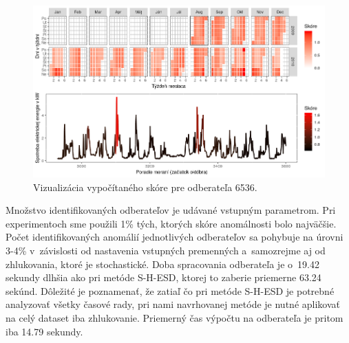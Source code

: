 \documentclass[a4paper,twoside,slovak,12pt,appendix]{article}
\begin{document}
\begin{figure}[H]
  \centering
  \includegraphics[width=\textwidth]{results_my_6536.png}
  \caption{Vizualizácia vypočítaného skóre pre odberateľa 6536.}
	\label{fig:results-my-6536}
\end{figure}

\noindent
Množstvo identifikovaných odberateľov je udávané vstupným parametrom. Pri
experimentoch sme použili 1\% tých, ktorých skóre anomálnosti bolo najväčšie.
Počet identifikovaných anomálií jednotlivých odberateľov sa pohybuje na úrovni
3-4\% v~závislosti od nastavenia vstupných premenných a~samozrejme aj od
zhlukovania, ktoré je stochastické. Doba spracovania odberateľa je o~19.42
sekundy dlhšia ako pri metóde S-H-ESD, ktorej to zaberie priemerne 63.24
sekúnd. Dôležité je poznamenať, že zatiaľ čo pri metóde S-H-ESD je potrebné
analyzovať všetky časové rady, pri nami navrhovanej metóde je nutné aplikovať
na celý dataset iba zhlukovanie. Priemerný čas výpočtu na odberateľa je pritom
iba 14.79 sekundy.

\newpage\null\thispagestyle{empty}\newpage


\newpage
\end{document}
